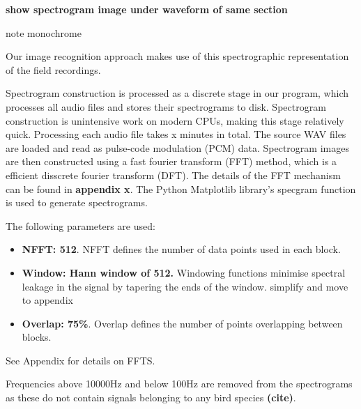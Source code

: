 \textbf{show spectrogram image under waveform of same section}

note monochrome

Our image recognition approach makes use of this spectrographic representation
of the field recordings.

Spectrogram construction is processed as a discrete stage in our program, which
processes all audio files and stores their spectrograms to disk.
Spectrogram construction is unintensive work on modern CPUs, making this stage
relatively quick.
Processing each audio file takes x minutes in total.
The source WAV files are loaded and read as pulse-code modulation (PCM) data.
Spectrogram images are then constructed using a fast fourier transform (FFT) method,
which is a efficient disscrete fourier transform (DFT).
The details of the FFT mechanism can be found in \textbf{appendix x}.
The Python Matplotlib library's specgram function is used to generate spectrograms.

The following parameters are used:
\begin{itemize}[noitemsep]
  \item \textbf{NFFT: 512}.
    NFFT defines the number of data points used in each block.
  \item \textbf{Window: Hann window of 512.}
    Windowing functions minimise spectral leakage in the signal by tapering the ends
    of the window.
    simplify and move to appendix
  \item \textbf{Overlap: 75\%}.
    Overlap defines the number of points overlapping between blocks.
\end{itemize}

See Appendix for details on FFTS.

Frequencies above 10000Hz and below 100Hz are removed from the spectrograms as these do
not contain signals belonging to any bird species \textbf{(cite)}.
